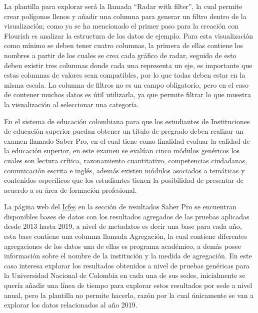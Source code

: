 \documentclass[
]{book}
\begin{document}
La plantilla para explorar será la llamada ``Radar with filter'', la cual permite crear polígonos llenos y añadir una columna para generar un filtro dentro de la visualización; como ya se ha mencionado el primer paso para la creación con Flourish es analizar la estructura de los datos de ejemplo. Para esta visualización como mínimo se deben tener cuatro columnas, la primera de ellas contiene los nombres a partir de los cuales se crea cada gráfico de radar, seguido de esto deben existir tres columnas donde cada una representa un eje, es importante que estas columnas de valores sean compatibles, por lo que todas deben estar en la misma escala. La columna de filtros no es un campo obligatorio, pero en el caso de contener muchos datos es útil utilizarla, ya que permite filtrar lo que muestra la visualización al seleccionar una categoría.

En el sistema de educación colombiana para que los estudiantes de Instituciones de educación superior puedan obtener un título de pregrado deben realizar un examen llamado Saber Pro, en el cual tiene como finalidad evaluar la calidad de la educación superior, en este examen se evalúan cinco módulos genéricos los cuales son lectura crítica, razonamiento cuantitativo, competencias ciudadanas, comunicación escrita e inglés, además existen módulos asociados a temáticas y contenidos específicos que los estudiantes tienen la posibilidad de presentar de acuerdo a su área de formación profesional.

La página web del \href{https://www.icfes.gov.co/web/guest/acerca-del-examen-saber-pro}{Icfes} en la sección de resultados Saber Pro se encuentran disponibles bases de datos con los resultados agregados de las pruebas aplicadas desde 2013 hasta 2019, a nivel de metadatos es decir una base para cada año, esta base contiene una columna llamada Agregación, la cual contiene diferentes agregaciones de los datos una de ellas es programa académico, a demás posee información sobre el nombre de la institución y la medida de agregación. En este caso interesa explorar los resultados obtenidos a nivel de pruebas genéricas para la Universidad Nacional de Colombia en cada una de sus sedes, inicialmente se quería añadir una línea de tiempo para explorar estos resultados por sede a nivel anual, pero la plantilla no permite hacerlo, razón por la cual únicamente se van a explorar los datos relacionados al año 2019.
\end{document}
